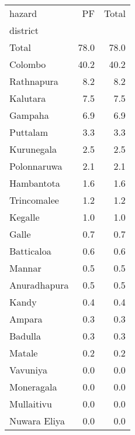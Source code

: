 \begin{tabular}{lrr}
\toprule
hazard &    PF &  Total \\
district     &       &        \\
\midrule
Total        &  78.0 &   78.0 \\
Colombo      &  40.2 &   40.2 \\
Rathnapura   &   8.2 &    8.2 \\
Kalutara     &   7.5 &    7.5 \\
Gampaha      &   6.9 &    6.9 \\
Puttalam     &   3.3 &    3.3 \\
Kurunegala   &   2.5 &    2.5 \\
Polonnaruwa  &   2.1 &    2.1 \\
Hambantota   &   1.6 &    1.6 \\
Trincomalee  &   1.2 &    1.2 \\
Kegalle      &   1.0 &    1.0 \\
Galle        &   0.7 &    0.7 \\
Batticaloa   &   0.6 &    0.6 \\
Mannar       &   0.5 &    0.5 \\
Anuradhapura &   0.5 &    0.5 \\
Kandy        &   0.4 &    0.4 \\
Ampara       &   0.3 &    0.3 \\
Badulla      &   0.3 &    0.3 \\
Matale       &   0.2 &    0.2 \\
Vavuniya     &   0.0 &    0.0 \\
Moneragala   &   0.0 &    0.0 \\
Mullaitivu   &   0.0 &    0.0 \\
Nuwara Eliya &   0.0 &    0.0 \\
\bottomrule
\end{tabular}
